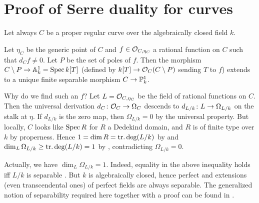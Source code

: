 \documentclass[a4paper,parskip=half,numbers=enddot, DIV=12]{scrreprt}
\begin{document}
\section{Proof of Serre duality for curves}
Let always $C$ be a proper regular curve over the algebraically closed field $k$.
\begin{prop}
	Let $\eta_C$ be the generic point of $C$ and $f\in\mathcal{O}_{C,\eta_C}$ a rational function on $C$ such that $d_Cf\neq 0$. Let $P$ be the set of poles of $f$. Then the morphism $C\setminus P\morphism\IA_k^1=\Spec k[T]$ (defined by $k[T]\morphism\Oo_C(C\setminus P)$ sending $T$ to $f$) extends to a unique finite separable morphism $C\morphism\IP_k^1$.
\end{prop}
\begin{rem}
	\begin{alphanumerate}
		\item {}Why do we find such an $f$? Let $L=\mathcal{O}_{C,\eta_C}$ be the field of rational functions on $C$. Then the universal derivation $d_C\colon\Oo_C\morphism\Omega_C$ descends to $d_{L/k}\colon L\morphism\Omega_{L/k}$ on the stalk at $\eta$. If $d_{L/k}$ is the zero map, then $\Omega_{L/k}=0$ by the universal property. But locally, $C$ looks like $\operatorname{Spec} R$ for $R$ a Dedekind domain, and $R$ is of finite type over $k$ by properness. Hence $1=\dim R=\operatorname{tr.deg} (L/k)$ by \cite[Theorem~10]{alg1} and $\dim_L\Omega_{L/k}\geq\operatorname{tr.deg}(L/k)=1$ by \cite[Corollary~16.17]{eisenbudCommAlg}, contradicting $\Omega_{L/k}=0$.
		\item Actually, we have $\dim_L\Omega_{L/k}=1$. Indeed, equality in the above inequality holds iff $L/k$ is separable \cite[Corollary~16.17]{eisenbudCommAlg}. But $k$ is algebraically closed, hence perfect and extensions (even transcendental ones) of perfect fields are always separable. The generalized notion of separability required here together with a proof can be found in \cite[Proposition~1.6.2]{alg2}.
	\end{alphanumerate}
\end{rem}
\end{document}

